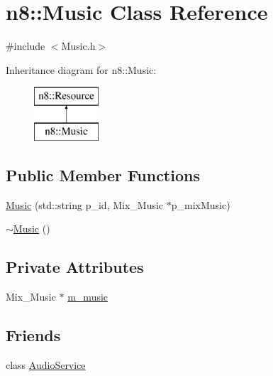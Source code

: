\hypertarget{classn8_1_1_music}{\section{n8\-:\-:Music Class Reference}
\label{classn8_1_1_music}
}


{\ttfamily \#include $<$Music.\-h$>$}

Inheritance diagram for n8\-:\-:Music\-:\begin{figure}[H]
\begin{center}
\leavevmode
\includegraphics[height=2.000000cm]{classn8_1_1_music}
\end{center}
\end{figure}
\subsection*{Public Member Functions}
\begin{DoxyCompactItemize}
\item 
\hyperlink{classn8_1_1_music_a6f7b8099e92cc93cfdde874cc9974576}{Music} (std\-::string p\-\_\-id, Mix\-\_\-\-Music $\ast$p\-\_\-mix\-Music)
\item 
\hyperlink{classn8_1_1_music_a3953e196b66bd023d77930fa7feb48cf}{$\sim$\-Music} ()
\end{DoxyCompactItemize}
\subsection*{Private Attributes}
\begin{DoxyCompactItemize}
\item 
Mix\-\_\-\-Music $\ast$ \hyperlink{classn8_1_1_music_a9189b4b9d590b9d8adb49d793cede1b4}{m\-\_\-music}
\end{DoxyCompactItemize}
\subsection*{Friends}
\begin{DoxyCompactItemize}
\item 
class \hyperlink{classn8_1_1_music_a37b580cb33a7b41e459ef8adf3e2dd75}{Audio\-Service}
\end{DoxyCompactItemize}


